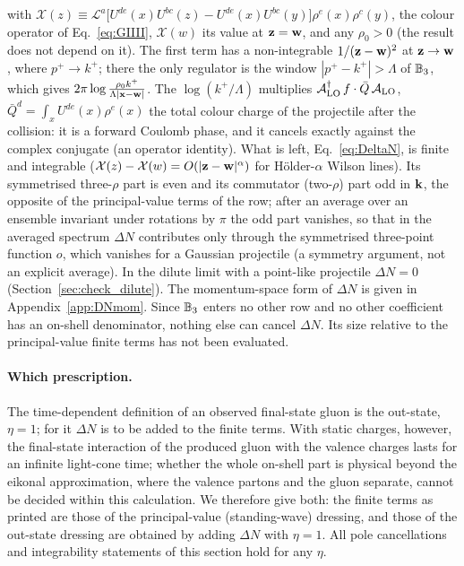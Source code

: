 with $\mathcal X(z)\equiv\mathcal L^a\big[U^{de}(x)U^{bc}(z)-U^{de}(x)U^{bc}(y)\big]\rho^e(x)\rho^c(y)$, the colour operator of Eq.~\eqref{eq:GIIII}, $\mathcal X(w)$ its value at $\mathbf{z}=\mathbf{w}$, and any $\rho_0>0$ (the result does not depend on it). The first term has a non-integrable $1/(\mathbf{z}-\mathbf{w})^2$ at $\mathbf{z}\to\mathbf{w}$, where $p^+\to k^+$; there the only regulator is the window $|p^+-k^+|>\Lambda$ of $\mathbb{B}_3$, which gives $2\pi\log\frac{\rho_0k^+}{\Lambda|\mathbf{x}-\mathbf{w}|}$. The $\log(k^+/\Lambda)$ multiplies $\mathcal A^\dagger_{\rm LO}\,f\cdot\bar Q\,\mathcal A_{\rm LO}$, $\bar Q^d=\int_xU^{de}(x)\rho^e(x)$ the total colour charge of the projectile after the collision: it is a forward Coulomb phase, and it cancels exactly against the complex conjugate (an operator identity). What is left, Eq.~\eqref{eq:DeltaN}, is finite and integrable ($\mathcal X(z)-\mathcal X(w)=O(|\mathbf{z}-\mathbf{w}|^\alpha)$ for H\"older-$\alpha$ Wilson lines). Its symmetrised three-$\rho$ part is even and its commutator (two-$\rho$) part odd in $\mathbf{k}$, the opposite of the principal-value terms of the row; after an average over an ensemble invariant under rotations by $\pi$ the odd part vanishes, so that in the averaged spectrum $\Delta N$ contributes only through the symmetrised three-point function $o$, which vanishes for a Gaussian projectile (a symmetry argument, not an explicit average). In the dilute limit with a point-like projectile $\Delta N=0$ (Section~\ref{sec:check_dilute}). The momentum-space form of $\Delta N$ is given in Appendix~\ref{app:DNmom}. Since $\mathbb{B}_3$ enters no other row and no other coefficient has an on-shell denominator, nothing else can cancel $\Delta N$. Its size relative to the principal-value finite terms has not been evaluated.

\paragraph{Which prescription.} The time-dependent definition of an observed final-state gluon is the out-state, $\eta=1$; for it $\Delta N$ is to be added to the finite terms. With static charges, however, the final-state interaction of the produced gluon with the valence charges lasts for an infinite light-cone time; whether the whole on-shell part is physical beyond the eikonal approximation, where the valence partons and the gluon separate, cannot be decided within this calculation. We therefore give both: the finite terms as printed are those of the principal-value (standing-wave) dressing, and those of the out-state dressing are obtained by adding $\Delta N$ with $\eta=1$. All pole cancellations and integrability statements of this section hold for any $\eta$.

